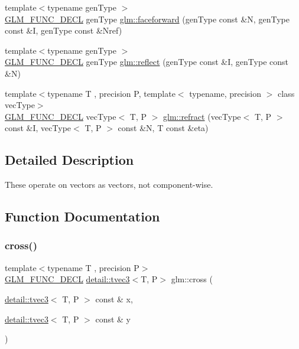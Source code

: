 \begin{DoxyCompactItemize}
\item 
{\footnotesize template$<$typename gen\+Type $>$ }\\\hyperlink{setup_8hpp_ab2d052de21a70539923e9bcbf6e83a51}{G\+L\+M\+\_\+\+F\+U\+N\+C\+\_\+\+D\+E\+CL} gen\+Type \hyperlink{group__core__func__geometric_ga4bbb036ef9527ee9f67384233029ed9b}{glm\+::faceforward} (gen\+Type const \&N, gen\+Type const \&I, gen\+Type const \&Nref)
\item 
{\footnotesize template$<$typename gen\+Type $>$ }\\\hyperlink{setup_8hpp_ab2d052de21a70539923e9bcbf6e83a51}{G\+L\+M\+\_\+\+F\+U\+N\+C\+\_\+\+D\+E\+CL} gen\+Type \hyperlink{group__core__func__geometric_gab63646fc36b81cf69d3ce123a72f76f2}{glm\+::reflect} (gen\+Type const \&I, gen\+Type const \&N)
\item 
{\footnotesize template$<$typename T , precision P, template$<$ typename, precision $>$ class vec\+Type$>$ }\\\hyperlink{setup_8hpp_ab2d052de21a70539923e9bcbf6e83a51}{G\+L\+M\+\_\+\+F\+U\+N\+C\+\_\+\+D\+E\+CL} vec\+Type$<$ T, P $>$ \hyperlink{group__core__func__geometric_ga99d8ddb244b129892babaca9778206d0}{glm\+::refract} (vec\+Type$<$ T, P $>$ const \&I, vec\+Type$<$ T, P $>$ const \&N, T const \&eta)
\end{DoxyCompactItemize}


\subsection{Detailed Description}
These operate on vectors as vectors, not component-\/wise. 

\subsection{Function Documentation}
\mbox{\label{group__core__func__geometric_ga89b91c2a256cfb62ecbc589d1ee36d3c}} 
\subsubsection{\texorpdfstring{cross()}{cross()}}
{\footnotesize\ttfamily template$<$typename T , precision P$>$ \\
\hyperlink{setup_8hpp_ab2d052de21a70539923e9bcbf6e83a51}{G\+L\+M\+\_\+\+F\+U\+N\+C\+\_\+\+D\+E\+CL} \hyperlink{structglm_1_1detail_1_1tvec3}{detail\+::tvec3}$<$T, P$>$ glm\+::cross (\begin{DoxyParamCaption}\item[{\hyperlink{structglm_1_1detail_1_1tvec3}{detail\+::tvec3}$<$ T, P $>$ const \&}]{x,  }\item[{\hyperlink{structglm_1_1detail_1_1tvec3}{detail\+::tvec3}$<$ T, P $>$ const \&}]{y }\end{DoxyParamCaption})}

